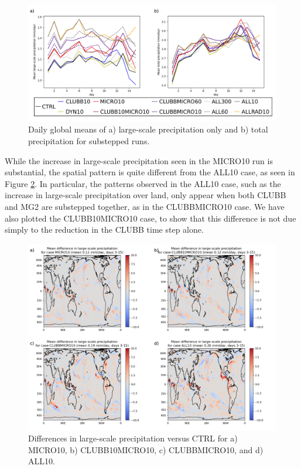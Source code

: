 \documentclass [11pt, proquest] {uwthesis}[2020/02/24]
\begin{document}
\begin{figure}
    \centering
    \includegraphics[width=5.5in]{Figure7.png}
    \caption{Daily global means of a) large-scale precipitation only and b) total precipitation for substepped runs.}
    \label{fig:precl-prect}
\end{figure}

While the increase in large-scale precipitation seen in the MICRO10 run is substantial, the spatial pattern is quite different from the ALL10 case, as seen in Figure \ref{fig:precl-map}. In particular, the patterns observed in the ALL10 case, such as the increase in large-scale precipitation over land, only appear when both CLUBB and MG2 are substepped together, as in the CLUBBMICRO10 case. We have also plotted the CLUBB10MICRO10 case, to show that this difference is not due simply to the reduction in the CLUBB time step alone.

\begin{figure}
    \centering
    \includegraphics[width=5.5in]{Figure8.png}
    \caption{Differences in large-scale precipitation versus CTRL for a) MICRO10, b) CLUBB10MICRO10, c) CLUBBMICRO10, and d) ALL10.}
    \label{fig:precl-map}
\end{figure}
\end{document}
